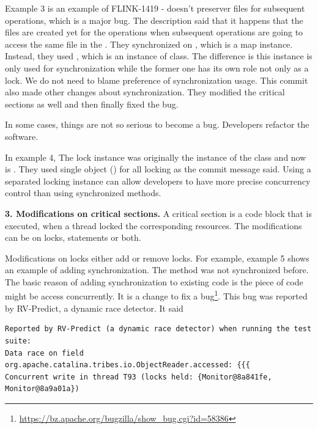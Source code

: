Example 3 is an example of FLINK-1419 -  doesn't preserver files for subsequent operations, which is a major bug. The description said that it happens that the files are created yet for the operations when subsequent operations are going to access the same file in the . They synchronized on , which is a map instance. Instead, they used , which is an instance of  class. The difference is this instance is only used for synchronization while the former one has its own role not only as a lock. We do not need to blame preference of synchronization usage. This commit also made other changes about synchronization. They modified the critical sections as well and then finally fixed the bug.


In some cases, things are not so serious to become a bug. Developers refactor the software.

In example 4, The lock instance was originally the instance of the class and now is . They used single object () for all locking as the commit message said. Using a separated locking instance can allow developers to have more precise concurrency control than using synchronized methods.

\noindent
\textbf{3. Modifications on critical sections.} A critical section is a code block that is executed, when a thread locked the corresponding resources. The modifications can be on locks, statements or both.%

Modifications on locks either add or remove locks. For example, example 5 shows an example of adding synchronization. The method was not synchronized before. The basic reason of adding synchronization to existing code is the piece of code might be access concurrently. It is a change to fix a bug\footnote{\url{https://bz.apache.org/bugzilla/show\_bug.cgi?id=58386}}. This bug was reported by RV-Predict, a dynamic race detector. It said

\begin{lstlisting}
Reported by RV-Predict (a dynamic race detector) when running the test suite:
Data race on field org.apache.catalina.tribes.io.ObjectReader.accessed: {{{
Concurrent write in thread T93 (locks held: {Monitor@8a841fe, Monitor@8a9a01a})
\end{lstlisting}

